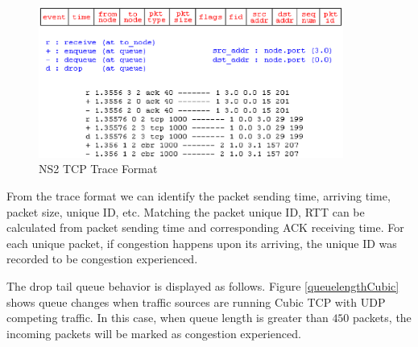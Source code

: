 \begin{figure}
\centering
\includegraphics[width=10cm]{format.eps}
\caption{NS2 TCP Trace Format}
\label{NS2Format}
\end{figure}
From the trace format we can identify the packet sending time, arriving time, packet size, unique ID, etc. Matching the packet unique ID, RTT can be calculated from packet sending time and corresponding ACK receiving time. For each unique packet, if congestion happens upon its arriving, the unique ID was recorded to be congestion experienced.

\par The drop tail queue behavior is displayed as follows.
Figure \ref{queuelengthCubic} shows queue changes when traffic sources are running Cubic TCP with UDP competing traffic. 
In this case, when queue length is greater than $450$ packets, the incoming packets will be marked as congestion experienced.


